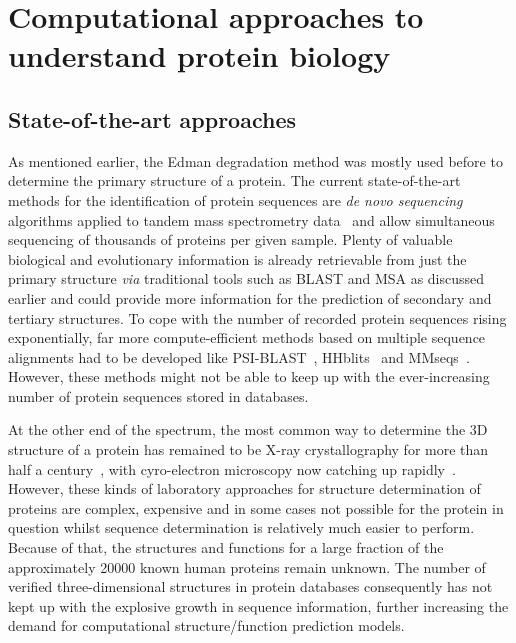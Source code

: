 \section{Computational approaches to understand protein biology}
\subsection{State-of-the-art approaches}
As mentioned earlier, the Edman degradation method was mostly used before to determine the primary structure of a protein. The current state-of-the-art methods for the identification of protein sequences are \textit{de novo sequencing} algorithms applied to tandem mass spectrometry data~\cite{protseq} and allow simultaneous sequencing of thousands of proteins per given sample. Plenty of valuable biological and evolutionary information is already retrievable from just the primary structure \textit{via} traditional tools such as BLAST and MSA as discussed earlier and could provide more information for the prediction of secondary and tertiary structures. To cope with the number of recorded protein sequences rising exponentially, far more compute-efficient methods based on multiple sequence alignments had to be developed like PSI-BLAST~\cite{psiblast}, HHblits~\cite{hhblits3} and MMseqs~\cite{mmseqs2}. However, these methods might not be able to keep up with the ever-increasing number of protein sequences stored in databases.

At the other end of the spectrum, the most common way to determine the 3D structure of a protein has remained to be X-ray crystallography for more than half a century~\cite{xray}, with cyro-electron microscopy now catching up rapidly~\cite{cyroem}. However, these kinds of laboratory approaches for structure determination of proteins are complex, expensive and in some cases not possible for the protein in question whilst sequence determination is relatively much easier to perform. Because of that, the structures and functions for a large fraction of the approximately 20000 known human proteins remain unknown. The number of verified three-dimensional structures in protein databases consequently has not kept up with the explosive growth in sequence information, further increasing the demand for computational structure/function prediction models.

